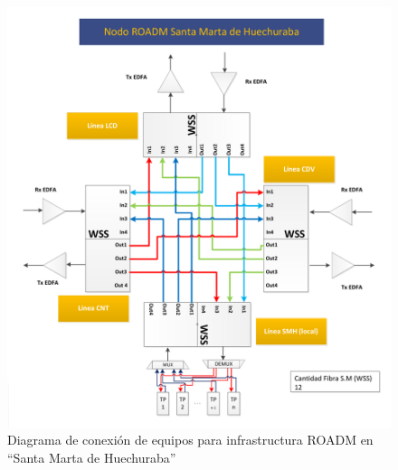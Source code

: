 \begin{figure}[H]
  \centering
  \includegraphics[width=17cm]{Imagenes/SMH.pdf}
  \caption{Diagrama de conexión de equipos para infrastructura ROADM en ``Santa Marta de Huechuraba''}
  \label{fig:drsmh}
\end{figure}

